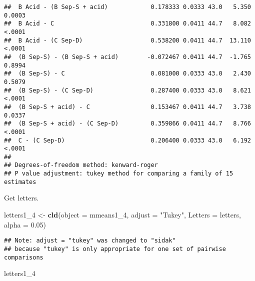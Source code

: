 \documentclass[
]{article}
\newenvironment{Shaded}{\begin{snugshade}}{\end{snugshade}}
\newcommand{\AttributeTok}[1]{\textcolor[rgb]{0.13,0.29,0.53}{#1}}
\newcommand{\FloatTok}[1]{\textcolor[rgb]{0.00,0.00,0.81}{#1}}
\newcommand{\FunctionTok}[1]{\textcolor[rgb]{0.13,0.29,0.53}{\textbf{#1}}}
\newcommand{\NormalTok}[1]{#1}
\newcommand{\OtherTok}[1]{\textcolor[rgb]{0.56,0.35,0.01}{#1}}
\newcommand{\StringTok}[1]{\textcolor[rgb]{0.31,0.60,0.02}{#1}}
\begin{document}
\begin{verbatim}
##  B Acid - (B Sep-S + acid)            0.178333 0.0333 43.0   5.350  0.0003
##  B Acid - C                           0.331800 0.0411 44.7   8.082  <.0001
##  B Acid - (C Sep-D)                   0.538200 0.0411 44.7  13.110  <.0001
##  (B Sep-S) - (B Sep-S + acid)        -0.072467 0.0411 44.7  -1.765  0.8994
##  (B Sep-S) - C                        0.081000 0.0333 43.0   2.430  0.5079
##  (B Sep-S) - (C Sep-D)                0.287400 0.0333 43.0   8.621  <.0001
##  (B Sep-S + acid) - C                 0.153467 0.0411 44.7   3.738  0.0337
##  (B Sep-S + acid) - (C Sep-D)         0.359866 0.0411 44.7   8.766  <.0001
##  C - (C Sep-D)                        0.206400 0.0333 43.0   6.192  <.0001
## 
## Degrees-of-freedom method: kenward-roger 
## P value adjustment: tukey method for comparing a family of 15 estimates
\end{verbatim}

Get letters.

\begin{Shaded}
\begin{Highlighting}[]
\NormalTok{letters1\_4 }\OtherTok{\textless{}{-}} \FunctionTok{cld}\NormalTok{(}\AttributeTok{object =}\NormalTok{ mmeans1\_4,}
                  \AttributeTok{adjust =} \StringTok{"Tukey"}\NormalTok{,}
                  \AttributeTok{Letters =}\NormalTok{ letters,}
                  \AttributeTok{alpha =} \FloatTok{0.05}\NormalTok{)}
\end{Highlighting}
\end{Shaded}

\begin{verbatim}
## Note: adjust = "tukey" was changed to "sidak"
## because "tukey" is only appropriate for one set of pairwise comparisons
\end{verbatim}

\begin{Shaded}
\begin{Highlighting}[]
\NormalTok{letters1\_4}
\end{Highlighting}
\end{Shaded}
\end{document}
